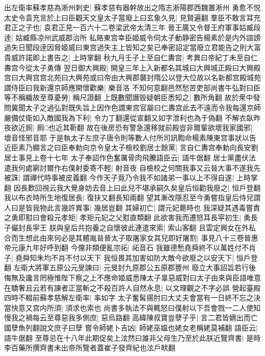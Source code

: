 出左衛率蘇孝慈為淅州刺史|{
	蘇孝慈有器幹故出之隋志淅陽郡西魏置淅州}
勇愈不悦太史令袁充言於上曰臣觀天文皇太子當廢上曰玄象久見|{
	見賢遍翻}
羣臣不敢言耳充君正之子也|{
	袁君正見一百六十二卷梁武帝太清三年}
晉王廣又令督王府軍事姑臧段逹|{
	姑臧縣凉州武威郡治所}
私賂東宫幸臣姬威令伺太子動静密告楊素於是内外諠謗過失日聞段逹因脅姬威曰東宫過失主上皆知之矣已奉密詔定當廢立君能告之則大富貴威許諾即上書告之|{
	上時掌翻}
秋九月壬子上至自仁夀宫|{
	考異曰帝紀丁未至自仁夀宫今從太子勇傳}
翌日御大興殿|{
	開皇三年上入新都名其城曰大興城正殿曰大興殿宫曰大興宫宫北苑曰大興苑或曰帝由大興郡襲封隋公以登大位故以名新都宫殿城苑}
謂侍臣曰我新還京師應開懷歡樂|{
	樂音洛}
不知何意翻邑然愁苦吏部尚書牛弘對曰臣等不稱軄故至尊憂勞|{
	稱尺證翻}
上既數聞譖毁疑朝臣悉知之|{
	數所角翻}
故於衆中發問冀聞太子之過弘對既失旨上因作色謂東宫官屬曰仁夀宫此去不遠而令我每還京師嚴備仗衛如入敵國我為下利|{
	令力丁翻還從宣翻又如字泄利也為于偽翻}
不解衣臥昨夜欲近厠|{
	厠□也近其靳翻}
故在後房恐有警急還移就前殿豈非爾輩欲壞我家國邪|{
	壞音怪邪音耶}
于是執太子左庶子唐令則等數人付所司訊鞫命楊素陳東宫事狀以告近臣素乃顯言之曰臣奉勅向京令皇太子檢校劉居士餘黨|{
	言自仁夀宫奉勅向長安劉居士事見上卷十七年}
太子奉詔作色奮厲骨肉飛騰語臣云|{
	語牛倨翻}
居士黨盡伏法遣我何處窮討爾作右僕射委寄不輕|{
	射音夜}
自檢校之何關我事又云㫺大事不遂我先被誅|{
	謂禪代時事被皮義翻}
今作天子竟乃令我不如諸弟一事以上不得自遂|{
	上時掌翻}
因長歎回視云我大覺身妨去音上曰此兒不堪承嗣久矣皇后恒勸我廢之|{
	恒戶登翻}
我以布衣時所生地復居長|{
	復扶又翻長知兩翻}
望其漸改隱忍至今勇嘗指皇后侍兒謂人曰是皆我物此言幾許異事|{
	幾居豈翻}
其婦初亡|{
	謂元妃薨時也}
我深疑其遇毒嘗責之勇即懟曰會殺元孝矩|{
	孝矩元妃之父懟直類翻}
此欲害我而遷怒耳長寜初生|{
	勇長子儼封長寜王}
朕與皇后共抱養之自懷彼此連遣來索|{
	索山客翻}
且雲定興女在外私合而生想此由來何必是其體胤㫺晉太子取屠家女其兒即好屠割|{
	事見八十三卷晉惠帝元康九年好呼到翻}
今儻非類便亂宗祏|{
	祏音石}
我雖德慙堯舜終不以萬姓付不肖子|{
	堯舜知朱均不肖不付以天下}
我恒畏其加害如防大敵今欲廢之以安天下|{
	恒戶登翻}
左衛大將軍五原公元旻諫曰|{
	元旻封九原郡公五原郡豐州}
廢立大事詔旨若行後悔無及讒言罔極惟陛下察之上不應命姬威悉陳太子辠惡威對曰太子由來與臣語唯意在驕奢且云若有諫者正當斬之不殺百許人自然永息|{
	以文理觀之不字必誤}
營起臺殿四時不輟前蘇孝慈解左衛率|{
	率如字}
太子奮髯揚肘曰大丈夫會當有一日終不忘之決當快意又宫内所須|{
	須求也索也}
尚書多執法不與輒怒曰僕射以下吾會戮一二人使知慢我之禍每云至尊惡我多側庶|{
	惡烏路翻}
高緯陳叔寶豈孽子乎|{
	言二君皆嫡出而亡國孽魚列翻說文庶子曰孽}
嘗令師姥卜吉凶|{
	師姥巫媪也姥女老稱姥莫補翻}
語臣云|{
	語牛倨翻}
至尊忌在十八年此期促矣上泫然曰誰非父母生乃至於此朕近覽齊書|{
	是時李百藥所撰齊書未出帝所覽者蓋崔子發齊紀也泫戶畎翻}
